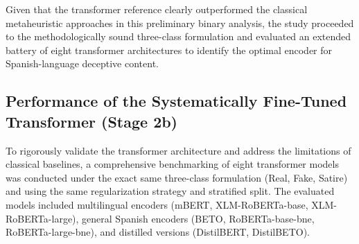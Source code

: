 \documentclass[informatics,article,submit,pdftex,moreauthors]{Definitions/mdpi}
\begin{document}
\begin{table}[H] 
\caption{Preliminary performance comparison on the \textbf{binary} task (Real vs.\ Fake). These results correspond to the initial phase of the study and are not directly comparable to the three-class benchmark in Table~\ref{tab:transformer_benchmarking}.}
\label{tab:final_comparison_all_models}
\centering
{}
\end{table}

Given that the transformer reference clearly outperformed the classical metaheuristic approaches in this preliminary binary analysis, the study proceeded to the methodologically sound three-class formulation and evaluated an extended battery of eight transformer architectures to identify the optimal encoder for Spanish-language deceptive content.

\subsection{Performance of the Systematically Fine-Tuned Transformer (Stage 2b)}\label{sec:transformer-results}
To rigorously validate the transformer architecture and address the limitations of classical baselines, a comprehensive benchmarking of eight transformer models was conducted under the exact same three-class formulation (Real, Fake, Satire) and using the same regularization strategy and stratified split. The evaluated models included multilingual encoders (mBERT, XLM-RoBERTa-base, XLM-RoBERTa-large), general Spanish encoders (BETO, RoBERTa-base-bne, RoBERTa-large-bne), and distilled versions (DistilBERT, DistilBETO).
\end{document}
